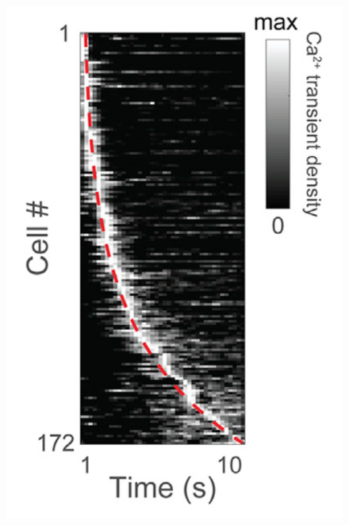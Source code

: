 \documentclass{apa}
\begin{document}
\begin{figure}
\begin{minipage}{\linewidth}
\begin{minipage}{.51\linewidth}
\begin{minipage}{.49\linewidth}
\begin{center}
				\includegraphics[width = \linewidth]{figs/MauEtal18.png}
			\end{center}
			\end{minipage}
			\begin{minipage}{.49\linewidth}

\end{minipage}
\end{minipage}
\end{minipage}
\end{figure}
\end{document}
